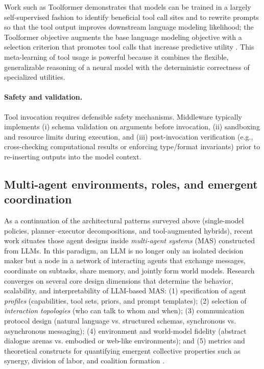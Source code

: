Work such as Toolformer demonstrates that models can be trained in a largely self-supervised fashion to identify beneficial tool call sites and to rewrite prompts so that the tool output improves downstream language modeling likelihood; the Toolformer objective augments the base language modeling objective with a selection criterion that promotes tool calls that increase predictive utility \cite{schick23}.  This meta-learning of tool usage is powerful because it combines the flexible, generalizable reasoning of a neural model with the deterministic correctness of specialized utilities.

\paragraph{Safety and validation.} Tool invocation requires defensible safety mechanisms.  Middleware typically implements (i) schema validation on arguments before invocation, (ii) sandboxing and resource limits during execution, and (iii) post-invocation verification (e.g., cross-checking computational results or enforcing type/format invariants) prior to re-inserting outputs into the model context.

\subsection{Multi-agent environments, roles, and emergent coordination}

As a continuation of the architectural patterns surveyed above (single-model policies, planner–executor decompositions, and tool-augmented hybrids), recent work situates those agent designs inside \emph{multi-agent systems} (MAS) constructed from LLMs. In this paradigm, an LLM is no longer only an isolated decision maker but a node in a network of interacting agents that exchange messages, coordinate on subtasks, share memory, and jointly form world models. Research converges on several core design dimensions that determine the behavior, scalability, and interpretability of LLM-based MAS: (1) specification of agent \emph{profiles} (capabilities, tool sets, priors, and prompt templates); (2) selection of \emph{interaction topologies} (who can talk to whom and when); (3) communication protocol design (natural language vs. structured schemas, synchronous vs. asynchronous messaging); (4) environment and world-model fidelity (abstract dialogue arenas vs. embodied or web-like environments); and (5) metrics and theoretical constructs for quantifying emergent collective properties such as synergy, division of labor, and coalition formation \cite{agentic_survey}.

